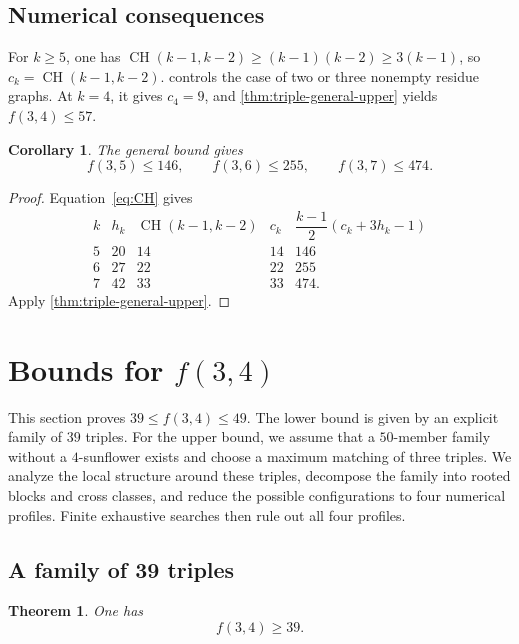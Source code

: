 \documentclass[11pt]{article}
\numberwithin{equation}{section}
\newtheorem{theorem}{Theorem}[section]
\newtheorem{corollary}[corollary]{Corollary}
\theoremstyle{definition}
\theoremstyle{remark}
\newcommand{\CH}{\operatorname{CH}}
\begin{document}
\subsection{Numerical consequences}

For $k\ge5$, one has
$\CH(k-1,k-2)\ge(k-1)(k-2)\ge3(k-1)$, so $c_k=\CH(k-1,k-2)$.
 controls the case of two or three nonempty
residue graphs. At $k=4$, it gives $c_4=9$, and
\cref{thm:triple-general-upper} yields $f(3,4)\le57$.

\begin{corollary}
\label{cor:triple-upper-values}
The general bound gives
\[
 f(3,5)\le146,
 \qquad
 f(3,6)\le255,
 \qquad
 f(3,7)\le474.
\]
\end{corollary}

\begin{proof}
Equation~\eqref{eq:CH} gives
\[
\begin{array}{c|ccc|c}
k&h_k&\CH(k-1,k-2)&c_k&
\dfrac{k-1}{2}(c_k+3h_k-1)\\
\hline
5&20&14&14&146\\
6&27&22&22&255\\
7&42&33&33&474.
\end{array}
\]
Apply \cref{thm:triple-general-upper}.
\end{proof}

\section{Bounds for \texorpdfstring{$f(3,4)$}{f(3,4)}}
\label{sec:f34}

This section proves $39\le f(3,4)\le49$. The lower bound is given by an
explicit family of $39$ triples. For the upper bound, we assume that a
$50$-member family without a $4$-sunflower exists and choose a maximum
matching of three triples. We analyze the local structure around these
triples, decompose the family into rooted blocks and cross classes, and reduce
the possible configurations to four numerical profiles. Finite exhaustive
searches then rule out all four profiles.

\subsection{A family of 39 triples}

\begin{theorem}
\label{thm:f34-lower}
One has
\[
 f(3,4)\ge39.
\]
\end{theorem}
\end{document}
